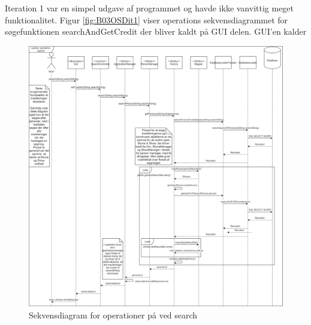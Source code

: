 Iteration 1 var en simpel udgave af programmet og havde ikke vanvittig meget funktionalitet. Figur \ref{fig:B03OSDit1} viser operations sekvensdiagrammet for søgefunktionen searchAndGetCredit der bliver kaldt på GUI delen. GUI'en kalder 



\begin{figure}[H]
\centerline{\includegraphics[width = 195mm]{images/B03OSD.png}}
    \caption{Sekvensdiagram for operationer på ved search}
    \label{fig:OperationsSekvensdiagramSearch}
\end{figure}


